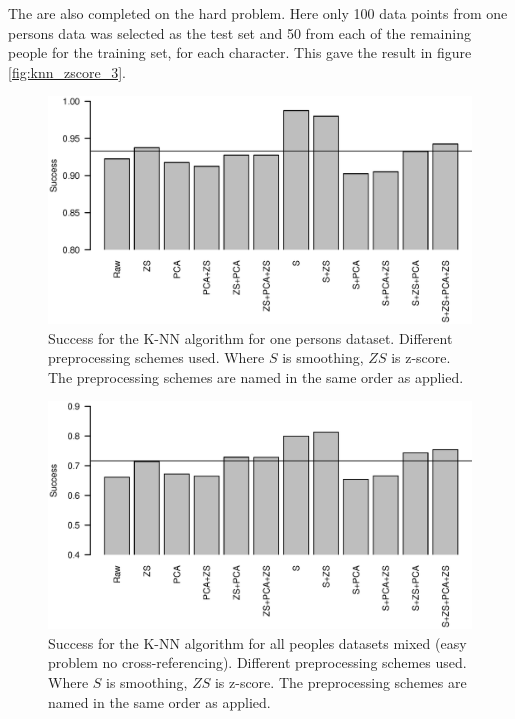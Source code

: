 The are also completed on the hard problem.
Here only 100 data points from one persons data was selected as the test set and 50 from each of the remaining people for the training set, for each character.
This gave the result in figure \ref{fig:knn_zscore_3}.


\begin{figure}[H]
\includegraphics[width = 0.95 \textwidth]{graphics/knn_zscore_1}
\caption[Success for K-NN with different preprocessing schemes. Simplified problem.]{Success for the K-NN algorithm for one persons dataset. Different preprocessing schemes used.
Where $S$ is smoothing, $ZS$ is z-score.
The preprocessing schemes are named in the same order as applied.}
\label{fig:knn_zscore_1}
\end{figure}

\begin{figure}[H]
\includegraphics[width = 0.95 \textwidth]{graphics/knn_zscore_2}
\caption[Success for K-NN with different preprocessing schemes. Easy problem.]{Success for the K-NN algorithm for all peoples datasets mixed (easy problem no cross-referencing). Different preprocessing schemes used.
Where $S$ is smoothing, $ZS$ is z-score.
The preprocessing schemes are named in the same order as applied.}
\label{fig:knn_zscore_2}
\end{figure}

